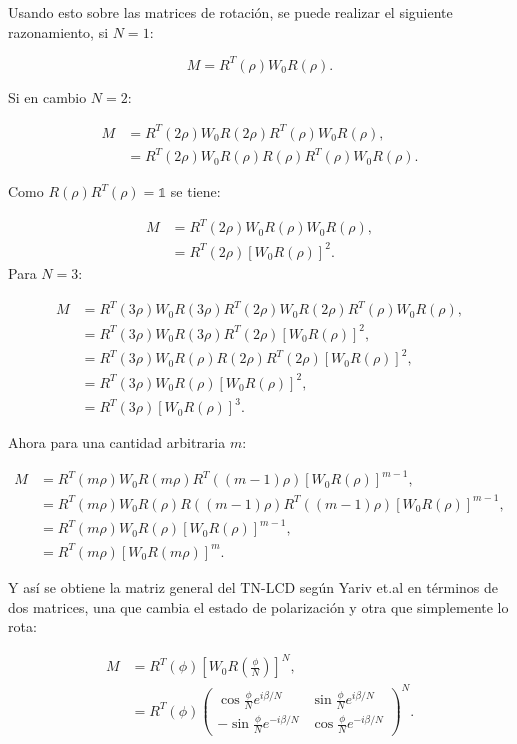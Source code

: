 Usando esto sobre las matrices de rotación, se puede realizar el
siguiente razonamiento, si $N=1$:

\begin{equation*}
  M = R^T(\rho)W_0R(\rho).
\end{equation*}

Si en cambio $N=2$:

\begin{align*}
  M &= R^T(2\rho)W_0R(2\rho)R^T(\rho)W_0R(\rho),\\
      &=R^T(2\rho)W_0R(\rho)R(\rho)R^T(\rho)W_0R(\rho).
\end{align*}

Como $R(\rho)R^T(\rho)=\mathds{1}$ se tiene:

\begin{align*}
 M &= R^T(2\rho)W_0R(\rho)W_0R(\rho),\\
     &=R^T(2\rho)\left[W_0R(\rho)\right]^2.
\end{align*}
Para $N=3$:

\begin{align*}
  M &= R^T(3\rho)W_0R(3\rho)R^T(2\rho)W_0R(2\rho)R^T(\rho)W_0R(\rho),\\
      &=R^T(3\rho)W_0R(3\rho)R^T(2\rho)\left[W_0R(\rho)\right]^2,\\
      &=R^T(3\rho)W_0R(\rho)R(2\rho)R^T(2\rho)\left[W_0R(\rho)\right]^2,\\
      &=R^T(3\rho)W_0R(\rho)\left[W_0R(\rho)\right]^2,\\
      &=R^T(3\rho)\left[W_0R(\rho)\right]^3.
\end{align*}

Ahora para una cantidad arbitraria $m$:

\begin{align*}
  M &= R^T(m\rho)W_0R(m\rho)R^T((m-1)\rho)\left[W_0R(\rho)\right]^{m-1},\\
      &=R^T(m\rho)W_0R(\rho)R((m-1)\rho)R^T((m-1)\rho)\left[W_0R(\rho)\right]^{m-1},\\  
      &=R^T(m\rho)W_0R(\rho)\left[W_0R(\rho)\right]^{m-1},\\
      &=R^T(m\rho)\left[W_0R(m\rho)\right]^{m}.
\end{align*}


Y así se obtiene la matriz general del TN-LCD según Yariv et.al  en
términos de dos matrices, una que cambia el estado de polarización y
otra que simplemente lo rota: 

\begin{align}
M&=R^T\left( \phi\right)
\left[W_0R\left(\frac{\phi}{N}\right)\right]^N,\\
&=R^T\left( \phi\right)
\begin{pmatrix}
  \cos{\frac{\phi}{N}e^{i\beta/N}} &  \sin{\frac{\phi}{N}e^{i\beta/N}}\\
  -\sin{\frac{\phi}{N}e^{-i\beta/N}} &  \cos{\frac{\phi}{N}e^{-i\beta/N}}  
\end{pmatrix}^N.
\label{eq:general_lcd_matrix}
\end{align}

